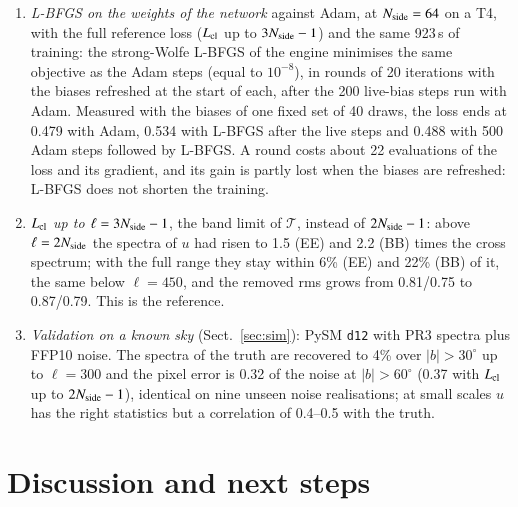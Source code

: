 \documentclass{aa}
\newcommand{\nside}{N_{\rm side}}
\begin{document}
\begin{enumerate}
  \item \emph{L-BFGS on the weights of the network} against Adam, at $\nside=64$ on a T4, with the full reference loss ($L_{\rm cl}$ up to $3\nside-1$) and the same 923\,s of training: the strong-Wolfe L-BFGS of the engine minimises the same objective as the Adam steps (equal to $10^{-8}$), in rounds of 20 iterations with the biases refreshed at the start of each, after the 200 live-bias steps run with Adam. Measured with the biases of one fixed set of 40 draws, the loss ends at 0.479 with Adam, 0.534 with L-BFGS after the live steps and 0.488 with 500 Adam steps followed by L-BFGS. A round costs about 22 evaluations of the loss and its gradient, and its gain is partly lost when the biases are refreshed: L-BFGS does not shorten the training.
  \item \emph{$L_{\rm cl}$ up to $\ell=3\nside-1$}, the band limit of $\mathcal{T}$, instead of $2\nside-1$: above $\ell=2\nside$ the spectra of $u$ had risen to 1.5 (EE) and 2.2 (BB) times the cross spectrum; with the full range they stay within 6\% (EE) and 22\% (BB) of it, the same below $\ell=450$, and the removed rms grows from 0.81/0.75 to 0.87/0.79. This is the reference.
  \item \emph{Validation on a known sky} (Sect.~\ref{sec:sim}): PySM \texttt{d12} with PR3 spectra plus FFP10 noise. The spectra of the truth are recovered to 4\% over $|b|>30^\circ$ up to $\ell=300$ and the pixel error is 0.32 of the noise at $|b|>60^\circ$ (0.37 with $L_{\rm cl}$ up to $2\nside-1$), identical on nine unseen noise realisations; at small scales $u$ has the right statistics but a correlation of 0.4--0.5 with the truth.
\end{enumerate}

\section{Discussion and next steps}
\end{document}
